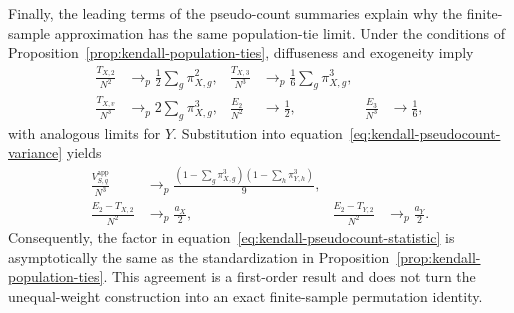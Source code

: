 Finally, the leading terms of the pseudo-count summaries explain why the
finite-sample approximation has the same population-tie limit. Under the
conditions of Proposition~\ref{prop:kendall-population-ties}, diffuseness and
exogeneity imply
\begin{align*}
 \frac{T_{X,2}}{N^2}
 &\mathrel{\longrightarrow_p}
 \frac12\sum_g\pi_{X,g}^2,
 &
 \frac{T_{X,3}}{N^3}
 &\mathrel{\longrightarrow_p}
 \frac16\sum_g\pi_{X,g}^3,\\
 \frac{T_{X,v}}{N^3}
 &\mathrel{\longrightarrow_p}
 2\sum_g\pi_{X,g}^3,
 &
 \frac{E_2}{N^2}
 &\longrightarrow\frac12,
 &
 \frac{E_3}{N^3}
 &\longrightarrow\frac16,
\end{align*}
with analogous limits for $Y$. Substitution into
equation~\eqref{eq:kendall-pseudocount-variance} yields
\begin{align*}
 \frac{V_{S,q}^{\mathrm{app}}}{N^3}
 &\mathrel{\longrightarrow_p}
 \frac{
 \left(1-\sum_g\pi_{X,g}^3\right)
 \left(1-\sum_h\pi_{Y,h}^3\right)
 }{9},\\
 \frac{E_2-T_{X,2}}{N^2}
 &\mathrel{\longrightarrow_p}\frac{a_X}{2},
 &
 \frac{E_2-T_{Y,2}}{N^2}
 &\mathrel{\longrightarrow_p}\frac{a_Y}{2}.
\end{align*}
Consequently, the factor in
equation~\eqref{eq:kendall-pseudocount-statistic} is asymptotically the same
as the standardization in
Proposition~\ref{prop:kendall-population-ties}. This agreement is a
first-order result and does not turn the unequal-weight construction into an
exact finite-sample permutation identity.
